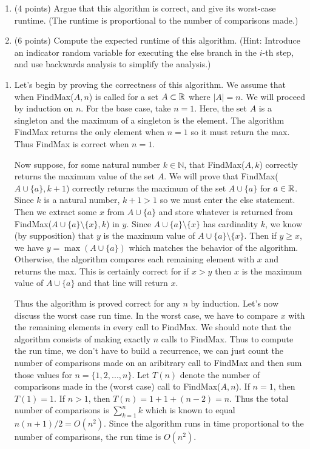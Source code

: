 \documentclass[11pt]{article}
\begin{document}
\begin{enumerate}

\item (4 points) Argue that this algorithm is correct, and give its worst-case
    runtime. (The runtime is proportional to the number of comparisons made.)

\item (6 points) Compute the expected runtime of this algorithm.  (Hint:
    Introduce an indicator random variable for executing the else branch in the
        $i$-th step, and use backwards analysis to simplify the analysis.)

\end{enumerate}
\answer

\begin{enumerate}

\item Let's begin by proving the correctness of this algorithm.
We assume that when FindMax($A, n$) is called for a set $A \subset \mathbb{R}$ where $|A| = n$.
We will proceed by induction on $n$.
For the base case, take $n = 1$.
Here, the set $A$ is a singleton and the maximum of a singleton is the element.
The algorithm FindMax returns the only element when $n=1$ so it must return the max.
Thus FindMax is correct when $n=1$.

Now suppose, for some natural number $k \in \mathbb{N}$, that FindMax($A, k$) correctly returns the maximum value of the set $A$.
We will prove that FindMax($A \cup \{ a \}, k+1$) correctly returns the maximum of the set $A \cup \{ a \}$ for $a \in \mathbb{R}$.
Since $k$ is a natural number, $k+1 > 1$ so we must enter the else statement.
Then we extract some $x$ from $A \cup \{ a \}$ and store whatever is returned from FindMax($A \cup \{ a \} \setminus \{ x \}, k$) in $y$.
Since $ A \cup \{ a \} \setminus \{ x \}$ has cardinality $k$, we know (by supposition) that $y$ is the maximum value of $A \cup \{ a \} \setminus \{ x \}$.
Then if $y \geq x$, we have $y = \max (A \cup \{ a \})$ which matches the behavior of the algorithm.
Otherwise, the algorithm compares each remaining element with $x$ and returns the max.
This is certainly correct for if $x > y$ then $x$ is the maximum value of $A \cup \{ a\}$ and that line will return $x$.

Thus the algorithm is proved correct for any $n$ by induction.
Let's now discuss the worst case run time.
In the worst case, we have to compare $x$ with the remaining elements in every call to FindMax.
We should note that the algorithm consists of making exactly $n$ calls to FindMax.
Thus to compute the run time, we don't have to build a recurrence, we can just count the number of comparisons made on an aribitrary call to FindMax and then sum those values for $n= \{ 1, 2, ..., n \}$.
Let $T(n)$ denote the number of comparisons made in the (worst case) call to FindMax($A, n$).
If $n = 1$, then $T(1) = 1$.
If $n > 1$, then $T(n) = 1 + 1 + (n-2) = n$.
Thus the total number of comparisons is $\sum _{k=1}^n k$ which is known to equal $n(n+1)/2 = O(n^2)$.
Since the algorithm runs in time proportional to the number of comparisons, the run time is $O(n^2)$.


\end{enumerate}
\end{document}
